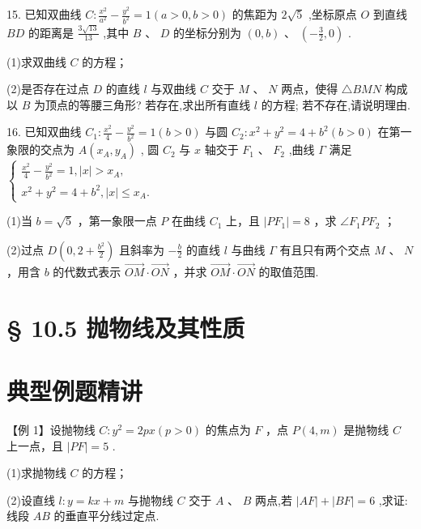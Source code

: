 15. 已知双曲线 $C : \frac{{x}^{2}}{{a}^{2}} - \frac{{y}^{2}}{{b}^{2}} = 1\left( {a > 0,b > 0}\right)$ 的焦距为 $2\sqrt{5}$ ,坐标原点 $O$ 到直线 ${BD}$ 的距离是 $\frac{3\sqrt{13}}{13}$ ,其中 $B\text{ 、 }D$ 的坐标分别为 $\left( {0,b}\right) \text{ 、 }\left( {-\frac{3}{2},0}\right)$ .

(1)求双曲线 $C$ 的方程；

(2)是否存在过点 $D$ 的直线 $l$ 与双曲线 $C$ 交于 $M\text{ 、 }N$ 两点，使得 $\bigtriangleup  {BMN}$ 构成以 $B$ 为顶点的等腰三角形? 若存在,求出所有直线 $l$ 的方程; 若不存在,请说明理由.

16. 已知双曲线 ${C}_{1} : \frac{{x}^{2}}{4} - \frac{{y}^{2}}{{b}^{2}} = 1\left( {b > 0}\right)$ 与圆 ${C}_{2} : {x}^{2} + {y}^{2} = 4 + {b}^{2}\left( {b > 0}\right)$ 在第一象限的交点为 $A\left( {{x}_{A},{y}_{A}}\right)$ , 圆 ${C}_{2}$ 与 $x$ 轴交于 ${F}_{1}\text{ 、 }{F}_{2}$ ,曲线 $\Gamma$ 满足 $\left\{  \begin{array}{l} \frac{{x}^{2}}{4} - \frac{{y}^{2}}{{b}^{2}} = 1,\left| x\right|  > {x}_{A}, \\  {x}^{2} + {y}^{2} = 4 + {b}^{2},\left| x\right|  \leq  {x}_{A}. \end{array}\right.$

(1)当 $b = \sqrt{5}$ ，第一象限一点 $P$ 在曲线 ${C}_{1}$ 上，且 $\left| {P{F}_{1}}\right|  = 8$ ，求 $\angle {F}_{1}P{F}_{2}$ ；

(2)过点 $D\left( {0,2 + \frac{{b}^{2}}{2}}\right)$ 且斜率为 $- \frac{b}{2}$ 的直线 $l$ 与曲线 $\Gamma$ 有且只有两个交点 $M$ 、 $N$ ，用含 $b$ 的代数式表示 $\overrightarrow{OM} \cdot  \overrightarrow{ON}$ ，并求 $\overrightarrow{OM} \cdot  \overrightarrow{ON}$ 的取值范围.

\section*{§ 10.5 抛物线及其性质}

\section*{典型例题精讲}

【例 1】设抛物线 $C : {y}^{2} = {2px}\left( {p > 0}\right)$ 的焦点为 $F$ ，点 $P\left( {4,m}\right)$ 是抛物线 $C$ 上一点，且 $\left| {PF}\right|  = 5$ .

(1)求抛物线 $C$ 的方程；

(2)设直线 $l : y = {kx} + m$ 与抛物线 $C$ 交于 $A$ 、 $B$ 两点,若 $\left| {AF}\right|  + \left| {BF}\right|  = 6$ ,求证: 线段 ${AB}$ 的垂直平分线过定点.

